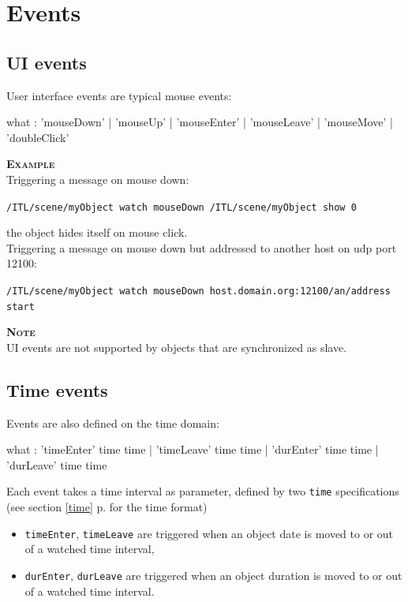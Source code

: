 \documentclass[a4paper,twoside]{report}
\newcommand{\sublevel}[1]	{\section{#1}}
\newcommand{\subsublevel}[1]	{\subsection{#1}}
\newcommand{\fullref}[1]	{\ref{#1} p.\pageref{#1}}
\newcommand{\OSC}[1]		{\texttt{#1}}
\newcommand{\example}		{\textbf{\hspace{-1.5cm}\textbf{\textsc{Example }}}}
\newcommand{\note}	[1]		{\vspace{2mm}\textbf{\hspace{-1.03cm}\textbf{\textsc{Note #1}}}}
\newcommand{\sample}	[1]			{\vspace{-2mm}\begin{center}\colorbox{mygrey}{
								\begin{minipage}[t]{0.9\columnwidth} 
								{\small \texttt{#1}}
								\end{minipage}}\end{center}}
\newcommand{\sampleindent}	{ \hspace{0.5cm} }
\begin{document}
\sublevel{Events}
\label{defevents}


\subsublevel{UI events}
\label{uievents}

User interface events are typical mouse events:
\begin{rail}
what : 'mouseDown' | 'mouseUp' | 'mouseEnter' | 'mouseLeave' | 'mouseMove' | 'doubleClick' 
\end{rail}
	
\example \\
Triggering a message on mouse down:
\sample{/ITL/scene/myObject watch mouseDown /ITL/scene/myObject show 0}
\sampleindent the object hides itself on mouse click. \\
Triggering a message on mouse down but addressed to another host on udp port 12100:
\sample{/ITL/scene/myObject watch mouseDown host.domain.org:12100/an/address start }

\note{} \\
UI events are not supported by objects that are synchronized as slave.

\subsublevel{Time events}
\label{timeevents}

Events are also defined on the time domain:
\begin{rail}
what : 	'timeEnter' time time | 'timeLeave' time time 
		| 'durEnter' time time | 'durLeave' time time 
\end{rail}

Each event takes a time interval as parameter, defined by two \OSC{time} specifications (see section \fullref{time} for the time format)

\begin{itemize}
\item \OSC{timeEnter}, \OSC{timeLeave} are triggered when an object date is moved to or out of a watched time interval,
\item \OSC{durEnter}, \OSC{durLeave} are triggered when an object duration is moved to or out of a watched time interval.
\end{itemize}
\end{document}
